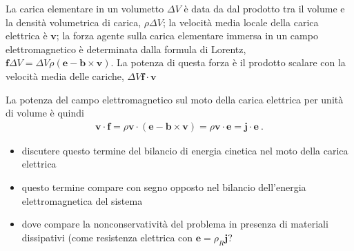 \documentclass[letterpaper,10pt,italian]{jupyterBook}
\begin{document}
\sphinxAtStartPar
{} 

\sphinxAtStartPar
La carica elementare in un volumetto \(\Delta V\) è data da dal prodotto tra il volume e la densità volumetrica di carica, \(\rho \Delta V\); la velocità media locale della carica elettrica è \(\mathbf{v}\); la forza agente sulla carica elementare immersa in un campo elettromagnetico è determinata dalla formula di Lorentz, \(\mathbf{f} \Delta V = \Delta V \rho \left( \mathbf{e} - \mathbf{b} \times \mathbf{v} \right)\). La potenza di questa forza è il prodotto scalare con la velocità media delle cariche, \(\Delta V \mathbf{f} \cdot \mathbf{v}\)

\sphinxAtStartPar
La potenza del campo elettromagnetico sul moto della carica elettrica per unità di volume è quindi
\begin{equation*}
\begin{split}\mathbf{v} \cdot \mathbf{f} = \rho \mathbf{v} \cdot \left( \mathbf{e} - \mathbf{b} \times \mathbf{v} \right) = \rho \mathbf{v} \cdot \mathbf{e} = \mathbf{j} \cdot \mathbf{e} \ .\end{split}
\end{equation*}
\sphinxAtStartPar
{}
\begin{itemize}
\item {} 
\sphinxAtStartPar
discutere questo termine del bilancio di energia cinetica nel moto della carica elettrica

\item {} 
\sphinxAtStartPar
questo termine compare con segno opposto nel bilancio dell’energia elettromagnetica del sistema

\item {} 
\sphinxAtStartPar
dove compare la non\sphinxhyphen{}conservatività del problema in presenza di materiali dissipativi (come resistenza elettrica con \(\mathbf{e} = \rho_R \mathbf{j}\)?

\end{itemize}
\end{document}
